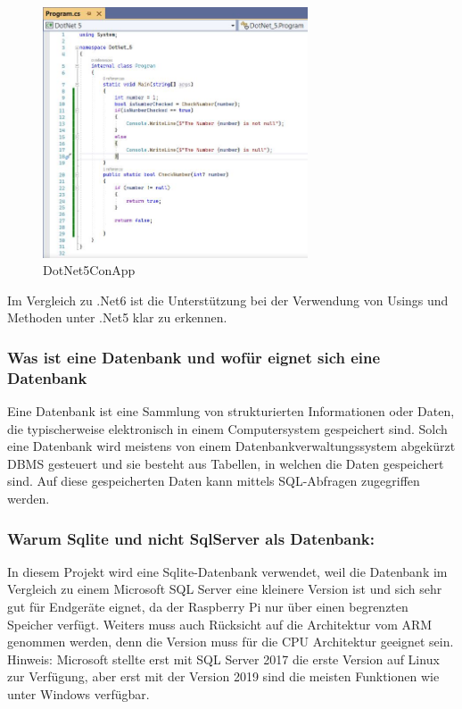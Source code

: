 \begin{figure}[H]
    \centering
    \includegraphics[width=0.7\textwidth]{./pics/DotNet5ConApp.JPG}
    \caption{DotNet5ConApp}
\end{figure}


Im Vergleich zu .Net6 ist die Unterstützung bei der Verwendung von Usings und Methoden unter .Net5 klar zu erkennen.


\subsubsection*{Was ist eine Datenbank und wofür eignet sich eine Datenbank}
Eine Datenbank ist eine Sammlung von strukturierten Informationen oder Daten, die typischerweise elektronisch in einem Computersystem gespeichert sind.
Solch eine Datenbank wird meistens von einem Datenbankverwaltungssystem abgekürzt DBMS gesteuert und sie besteht aus Tabellen, in welchen die Daten gespeichert sind.
Auf diese gespeicherten Daten kann mittels SQL-Abfragen zugegriffen werden.



\subsubsection*{Warum Sqlite und nicht SqlServer als Datenbank:}

In diesem Projekt wird eine Sqlite-Datenbank verwendet, weil die Datenbank im Vergleich zu einem Microsoft SQL Server eine kleinere
Version ist und sich sehr gut für Endgeräte eignet, da der Raspberry Pi nur über einen begrenzten Speicher verfügt.
Weiters muss auch Rücksicht auf die Architektur vom ARM genommen werden, denn die Version muss für die CPU Architektur geeignet sein.
Hinweis: Microsoft stellte erst mit SQL Server 2017 die erste Version auf Linux zur Verfügung, aber erst mit der Version 2019 sind die meisten
Funktionen wie unter Windows verfügbar.

